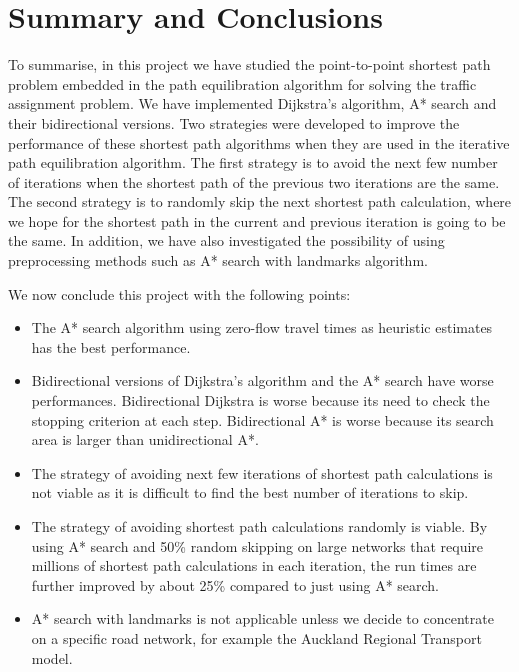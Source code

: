 \chapter{Summary and Conclusions} \label{chap:conclusions}
To summarise,
in this project we have studied the point-to-point shortest path problem embedded in the path equilibration algorithm for solving the traffic assignment problem.
We have implemented Dijkstra's algorithm, A* search and their bidirectional versions.
Two strategies were developed to improve the performance of these shortest path algorithms when they are used in the iterative path equilibration algorithm.
The first strategy is to avoid the next few number of iterations
when the shortest path of the previous two iterations are the same.
The second strategy is to randomly skip the next shortest path calculation,
where we hope for the shortest path in the current and previous iteration is going to be the same.
In addition,
we have also investigated the possibility of using preprocessing methods such as A* search with landmarks algorithm.

We now conclude this project with the following points:
\begin{itemize}
    \item The A* search algorithm using zero-flow travel times as heuristic estimates has the best performance.
    \item Bidirectional versions of Dijkstra's algorithm and the A* search have worse performances. Bidirectional Dijkstra is worse because its need to check the stopping criterion at each step. Bidirectional A* is worse because its search area is larger than unidirectional A*.
    \item The strategy of avoiding next few iterations of shortest path calculations is not viable as it is difficult to find the best number of iterations to skip.
    \item The strategy of avoiding shortest path calculations randomly is viable. By using A* search and 50\% random skipping on large networks that require millions of shortest path calculations in each iteration, the run times are further improved by about 25\% compared to just using A* search.
    \item A* search with landmarks is not applicable unless we decide to concentrate on a specific road network, for example the Auckland Regional Transport model.
\end{itemize}

